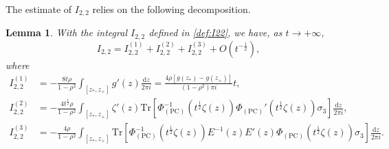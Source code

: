\documentclass[11pt,a4paper]{article}
\newtheorem{lemma}[thm]{Lemma}
\numberwithin{equation}{section}
\begin{document}
The estimate of $I_{2,2}$ relies on the following decomposition.
\begin{lemma}\label{I-22}
With the integral $I_{2,2}$ defined in \eqref{def:I22}, we have, as $t\to+\infty$,
\begin{equation}\label{eq:decompI22}
I_{2,2}=I^{(1)}_{2,2}+I^{(2)}_{2,2}+I^{(3)}_{2,2}+O\left(t^{-\frac{1}{2}}\right),
\end{equation}
where
\begin{align}
I^{(1)}_{2,2}&=-\frac{8t\rho }{1-\rho^2}\int_{[z_*,z_+]}g'(z)\frac{\mathrm{d}z}{2\pi i}=\frac{4\rho[g(z_*)-g(z_+)]}{(1-\rho^2)\pi i}t,\label{def:I221}\\
I^{(2)}_{2,2}&=-\frac{4t^{\frac{1}{2}}\rho }{1-\rho^2}\int_{[z_*,z_+]}
\zeta'(z)\mathrm{Tr}\left[\Phi_{(\mathrm{PC})}^{-1}(t^{\frac{1}{2}}\zeta(z))
\Phi_{(\mathrm{PC})}'(t^{\frac{1}{2}}\zeta(z))\sigma_3\right]\frac{\mathrm{d}z}{2\pi i},
\label{def:I222}\\
I^{(3)}_{2,2}&=-\frac{4\rho}{1-\rho^2}\int_{[z_*,z_+]}\mathrm{Tr}
\left[\Phi_{(\mathrm{PC})}^{-1}(t^{\frac{1}{2}}\zeta(z))E^{-1}(z)E'(z)
\Phi_{(\mathrm{PC})}(t^{\frac{1}{2}}\zeta(z))\sigma_3\right]\frac{\mathrm{d}z}{2\pi i}.\label{def:I223}
\end{align}
\end{lemma}
\end{document}
